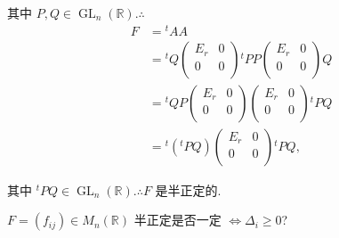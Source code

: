 \documentclass{ctexart}
\begin{document}
\begin{solution}
    其中 $P,Q\in\operatorname{GL}_n(\mathbb{R}).\therefore$
    \begin{align*}
        F & ={}^tAA \\
        & ={}^tQ\begin{pmatrix}
            E_r & 0 \\
            0 & 0 \\
        \end{pmatrix}{}^tPP\begin{pmatrix}
            E_r & 0 \\
            0 & 0 \\
        \end{pmatrix}Q \\
        & ={}^tQP\begin{pmatrix}
            E_r & 0 \\
            0 & 0 \\
        \end{pmatrix}\begin{pmatrix}
            E_r & 0 \\
            0 & 0 \\
        \end{pmatrix}{}^tPQ \\
        & ={}^t({}^tPQ)\begin{pmatrix}
            E_r & 0 \\
            0 & 0 \\
        \end{pmatrix}{}^tPQ,
    \end{align*}

    其中 ${}^tPQ\in\operatorname{GL}_n(\mathbb{R}).\therefore F$ 是半正定的.
\end{solution}
\begin{exercisec}%
    $F=(f_{ij})\in M_n(\mathbb{R})$ 半正定是否一定 $\Leftrightarrow\Delta_i\geq0$?
\end{exercisec}
\end{document}
